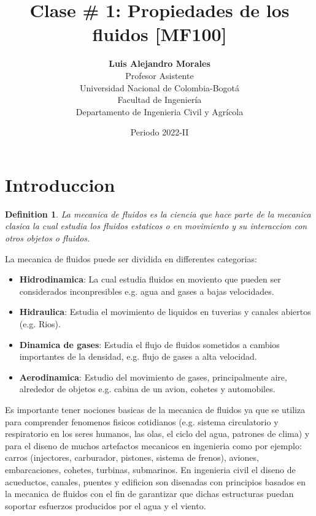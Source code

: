 \documentclass[10pt, oneside]{article}
\title{Clase \# 1: Propiedades de los fluidos [MF100]}
\author{\textbf{Luis Alejandro Morales}\\ \vspace{0.4cm} Profesor Asistente \\ Universidad Nacional de Colombia-Bogot\'a\\Facultad de Ingenier\'ia \\ Departamento de Ingenieria Civil y Agr\'icola}
\date{Periodo 2022-II}
\newtheorem{defn}{Definition}
\begin{document}
\maketitle
\tableofcontents

\vspace{.25in}

\section{Introduccion}
\begin{defn}
La mecanica de fluidos es la ciencia que hace parte de la mecanica clasica la cual estudia los fluidos estaticos o en movimiento y su interaccion con otros objetos o fluidos.
\end{defn}
La mecanica de fluidos puede ser dividida en differentes categorias:
\begin{itemize}
\item \textbf{Hidrodinamica}: La cual estudia fluidos en moviento que pueden ser considerados inconpresibles e.g. agua and gases a bajas velocidades.
\item \textbf{Hidraulica}: Estudia el movimiento de liquidos en tuverias y canales abiertos (e.g. Rios).
\item \textbf{Dinamica de gases}: Estudia el flujo de fluidos sometidos a cambios importantes de la densidad, e.g. flujo de gases a alta velocidad.
\item \textbf{Aerodinamica}: Estudio del movimiento de gases, principalmente aire, alrededor de objetos e.g. cabina de un avion, cohetes y automobiles.
\end{itemize}

Es importante tener nociones basicas de la mecanica de fluidos ya que se utiliza para comprender fenomenos fisicos cotidianos (e.g. sistema circulatorio y respiratorio en los seres humanos, las olas, el ciclo del agua, patrones de clima) y para el diseno de muchos artefactos mecanicos en ingenieria como por ejemplo: carros (injectores, carburador, pistones, sistema de frenos), aviones, embarcaciones, cohetes, turbinas, submarinos. En ingenieria civil el diseno de acueductos, canales, puentes y edificion son disenadas con principios basados en la mecanica de fluidos con el fin de garantizar que dichas estructuras puedan soportar esfuerzos producidos por el agua y el viento. 
\end{document}
